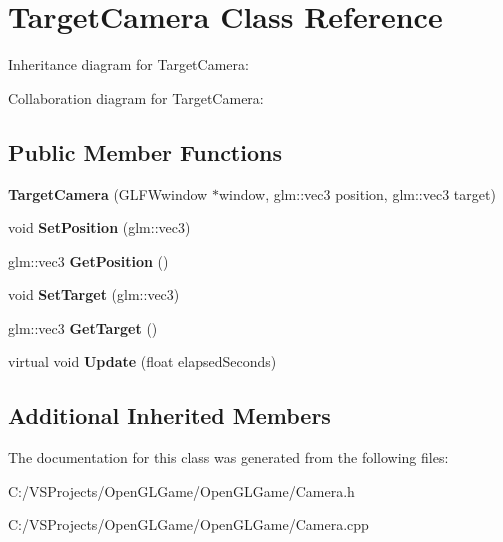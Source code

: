 \hypertarget{class_target_camera}{\section{Target\-Camera Class Reference}
\label{class_target_camera}
}


Inheritance diagram for Target\-Camera\-:


Collaboration diagram for Target\-Camera\-:
\subsection*{Public Member Functions}
\begin{DoxyCompactItemize}
\item 
\hypertarget{class_target_camera_aaf2f179cec7679cd97f56d490c4a3bd9}{{\bfseries Target\-Camera} (G\-L\-F\-Wwindow $\ast$window, glm\-::vec3 position, glm\-::vec3 target)}\label{class_target_camera_aaf2f179cec7679cd97f56d490c4a3bd9}

\item 
\hypertarget{class_target_camera_ae82ff4adf63370f7403b0586810297f1}{void {\bfseries Set\-Position} (glm\-::vec3)}\label{class_target_camera_ae82ff4adf63370f7403b0586810297f1}

\item 
\hypertarget{class_target_camera_aff8414199ac497232d3514b8cf6e44d1}{glm\-::vec3 {\bfseries Get\-Position} ()}\label{class_target_camera_aff8414199ac497232d3514b8cf6e44d1}

\item 
\hypertarget{class_target_camera_a36141a534a662b7fd869dc4314eea5b0}{void {\bfseries Set\-Target} (glm\-::vec3)}\label{class_target_camera_a36141a534a662b7fd869dc4314eea5b0}

\item 
\hypertarget{class_target_camera_ae85b9e1464394cea3239ffde275218cd}{glm\-::vec3 {\bfseries Get\-Target} ()}\label{class_target_camera_ae85b9e1464394cea3239ffde275218cd}

\item 
\hypertarget{class_target_camera_aeea1042a42cf0d682d1709ef39c994f0}{virtual void {\bfseries Update} (float elapsed\-Seconds)}\label{class_target_camera_aeea1042a42cf0d682d1709ef39c994f0}

\end{DoxyCompactItemize}
\subsection*{Additional Inherited Members}


The documentation for this class was generated from the following files\-:\begin{DoxyCompactItemize}
\item 
C\-:/\-V\-S\-Projects/\-Open\-G\-L\-Game/\-Open\-G\-L\-Game/Camera.\-h\item 
C\-:/\-V\-S\-Projects/\-Open\-G\-L\-Game/\-Open\-G\-L\-Game/Camera.\-cpp\end{DoxyCompactItemize}
